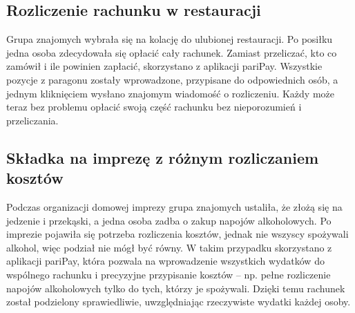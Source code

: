 \documentclass[12pt,titlepage]{article}
\begin{document}
\subsection{Rozliczenie rachunku w restauracji}
Grupa znajomych wybrała się na kolację do ulubionej restauracji. Po posiłku jedna osoba zdecydowała się opłacić cały rachunek. Zamiast przeliczać, kto co zamówił i ile powinien zapłacić, skorzystano z aplikacji pariPay. Wszystkie pozycje z paragonu zostały wprowadzone, przypisane do odpowiednich osób, a jednym kliknięciem wysłano znajomym wiadomość o rozliczeniu. Każdy może teraz bez problemu opłacić swoją część rachunku bez nieporozumień i przeliczania.
\subsection{Składka na imprezę z różnym rozliczaniem kosztów}
Podczas organizacji domowej imprezy grupa znajomych ustaliła, że złożą się na jedzenie i przekąski, a jedna osoba zadba o zakup napojów alkoholowych. Po imprezie pojawiła się potrzeba rozliczenia kosztów, jednak nie wszyscy spożywali alkohol, więc podział nie mógł być równy. W takim przypadku skorzystano z aplikacji pariPay, która pozwala na wprowadzenie wszystkich wydatków do wspólnego rachunku i precyzyjne przypisanie kosztów – np. pełne rozliczenie napojów alkoholowych tylko do tych, którzy je spożywali. Dzięki temu rachunek został podzielony sprawiedliwie, uwzględniając rzeczywiste wydatki każdej osoby.
\end{document}
